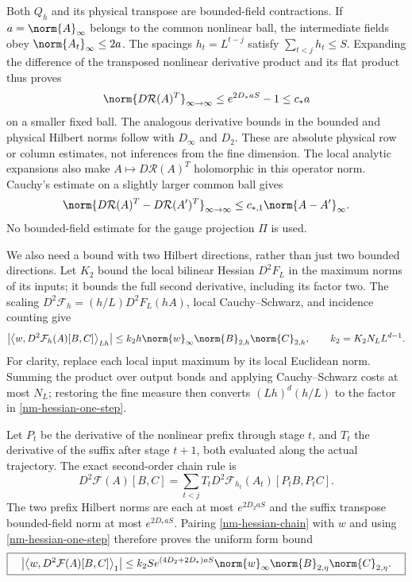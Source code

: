 Both $Q_h$ and its physical transpose are bounded-field
contractions. If $a=\norm{A}_\infty$ belongs to the common nonlinear
ball, the intermediate fields obey $\norm{A_t}_\infty\le2a$.
The spacings $h_t=L^{t-j}$ satisfy $\sum_{t<j}h_t\le S$.
Expanding the difference of the transposed nonlinear derivative
product and its flat product thus proves
\begin{equation}\label{nm-adjoint-composite}
 \norm{D\mathcal R(A)^T}_{\infty\to\infty}
 \le e^{2D_*aS}-1\le c_*a
\end{equation}
on a smaller fixed ball. The analogous derivative bounds in the
bounded and physical Hilbert norms follow with $D_\infty$ and
$D_2$. These are absolute physical row or column estimates, not
inferences from the fine dimension. The local analytic expansions
also make $A\mapsto D\mathcal R(A)^T$ holomorphic in this operator
norm. Cauchy's estimate on a slightly larger common ball gives
\begin{equation}\label{nm-adjoint-lipschitz}
 \norm{D\mathcal R(A)^T-D\mathcal R(A')^T}_{\infty\to\infty}
 \le c_{*,1}\norm{A-A'}_\infty.
\end{equation}
No bounded-field estimate for the gauge projection $\Pi$ is used.

We also need a bound with two Hilbert directions, rather than just
two bounded directions. Let $K_2$ bound the local bilinear Hessian
$D^2F_L$ in the maximum norms of its inputs; it bounds the full
second derivative, including its factor two. The scaling
$D^2\mathcal F_h=(h/L)D^2F_L(hA)$, local Cauchy--Schwarz, and
incidence counting give
\begin{equation}\label{nm-hessian-one-step}
 \left|\left\langle w,D^2\mathcal F_h(A)[B,C]\right\rangle_{Lh}\right|
 \le k_2h\norm{w}_\infty\norm{B}_{2,h}\norm{C}_{2,h},
 \qquad k_2=K_2N_LL^{d-1}.
\end{equation}
For clarity, replace each local input maximum by its local
Euclidean norm. Summing the product over output bonds and applying
Cauchy--Schwarz costs at most $N_L$; restoring the fine measure
then converts $(Lh)^d(h/L)$ to the factor in
\eqref{nm-hessian-one-step}.

Let $P_t$ be the derivative of the nonlinear prefix through stage
$t$, and $T_t$ the derivative of the suffix after stage $t+1$,
both evaluated along the actual trajectory. The exact second-order
chain rule is
\begin{equation}\label{nm-hessian-chain}
 D^2\mathcal F(A)[B,C]
 =\sum_{t<j}T_tD^2\mathcal F_{h_t}(A_t)[P_tB,P_tC].
\end{equation}
The two prefix Hilbert norms are each at most $e^{2D_2aS}$ and the
suffix transpose bounded-field norm at most $e^{2D_*aS}$.
Pairing \eqref{nm-hessian-chain} with $w$ and using
\eqref{nm-hessian-one-step} therefore proves the uniform form bound
\begin{equation}\label{nm-hessian-composite}
 \boxed{\quad
 \left|\left\langle w,D^2\mathcal F(A)[B,C]\right\rangle_1\right|
 \le k_2S e^{(4D_2+2D_*)aS}
       \norm{w}_\infty\norm{B}_{2,\eta}\norm{C}_{2,\eta}.
 \quad}
\end{equation}

